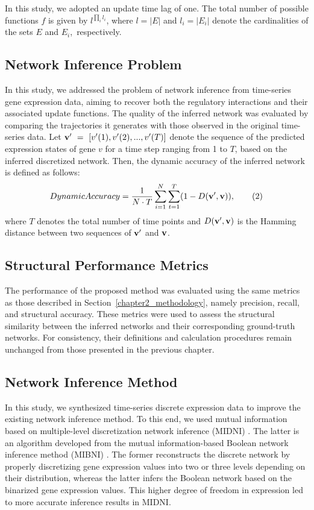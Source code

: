 In this study, we adopted an update time lag of one. The total number of possible functions \( f \) is given by \( l^{\prod_i l_i} \), where \( l = |E| \) and \( l_i = |E_i| \) denote the cardinalities of the sets \( E \) and \( E_i \),~respectively.

\subsection{Network Inference Problem}
In this study, we addressed the problem of network inference from time-series gene expression data, aiming to recover both the regulatory interactions and their associated update functions. The quality of the inferred network was evaluated by comparing the trajectories it generates with those observed in the original time-series data. Let \({\bf v'}~=~[v'(1), v'(2),...,v'(T)]\) denote the sequence of the predicted expression states of gene \(v\) for a time step ranging from 1 to \(T\), based on the inferred discretized network. Then, the dynamic accuracy of the inferred network is defined as follows:
\[Dynamic Accuracy = \frac{1}{N \cdot T}\sum_{i=1}^{N}\sum_{t=1}^{T}(1-D({\bf{v', v}})), \tag{2} \label{eq:special}  \]
where \(T\) denotes the total number of time points and \(D({\bf{v', v}})\) is the Hamming distance between two sequences of \({\bf v'}\) and \({\bf v}\).

\subsection{Structural Performance Metrics}\label{sub:metrics}
The performance of the proposed method was evaluated using the same metrics as those described in Section~\ref{chapter2_methodology}, namely precision, recall, and structural accuracy. These metrics were used to assess the structural similarity between the inferred networks and their corresponding ground-truth networks. For consistency, their definitions and calculation procedures remain unchanged from those presented in the previous chapter.

\subsection{Network Inference Method} \label{network_inference}
In this study, we synthesized time-series discrete expression data to improve the existing network inference method. To this end, we used mutual information based on multiple-level discretization network inference (MIDNI) \parencite{anh2023mutual}. The latter is an algorithm developed from the mutual information-based Boolean network inference method (MIBNI) \parencite{Barman2017}. The former reconstructs the discrete network by properly discretizing gene expression values into two or three levels depending on their distribution, whereas the latter infers the Boolean network based on the binarized gene expression values. This higher degree of freedom in expression led to more accurate inference results in MIDNI.

